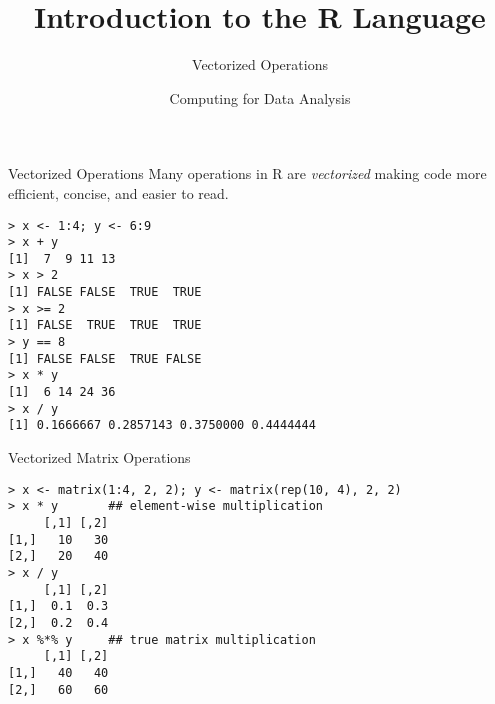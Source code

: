 \documentclass[aspectratio=169]{beamer}
\title[The R Language]{Introduction to the R Language}
\subtitle{Vectorized Operations}
\date{Computing for Data Analysis}
\begin{document}
\begin{frame}
  \titlepage
\end{frame}


\begin{frame}[fragile]{Vectorized Operations}
Many operations in R are \textit{vectorized} making code more
efficient, concise, and easier to read.
\begin{verbatim}
> x <- 1:4; y <- 6:9
> x + y
[1]  7  9 11 13
> x > 2
[1] FALSE FALSE  TRUE  TRUE
> x >= 2
[1] FALSE  TRUE  TRUE  TRUE
> y == 8
[1] FALSE FALSE  TRUE FALSE
> x * y
[1]  6 14 24 36
> x / y
[1] 0.1666667 0.2857143 0.3750000 0.4444444
\end{verbatim}
\end{frame}

\begin{frame}[fragile]{Vectorized Matrix Operations}
\begin{verbatim}
> x <- matrix(1:4, 2, 2); y <- matrix(rep(10, 4), 2, 2)
> x * y       ## element-wise multiplication
     [,1] [,2]
[1,]   10   30
[2,]   20   40
> x / y
     [,1] [,2]
[1,]  0.1  0.3
[2,]  0.2  0.4
> x %*% y     ## true matrix multiplication
     [,1] [,2]
[1,]   40   40
[2,]   60   60
\end{verbatim}
\end{frame}
\end{document}
